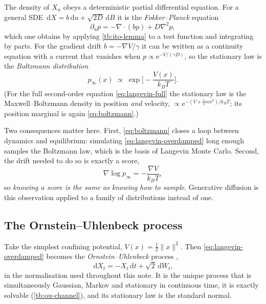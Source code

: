 \documentclass[11pt,a4paper]{article}
\newcommand{\dd}{\,\mathrm d}
\newcommand{\e}{\mathrm e}
\begin{document}
The density of $X_u$ obeys a deterministic partial differential equation. For a general SDE
$\dd X=b\dd u+\sqrt{2D}\dd B$ it is the \emph{Fokker--Planck} equation
\begin{equation}
 \partial_u p=-\nabla\cdot(bp)+D\nabla^2p ,
 \label{eq:fokker-planck}
\end{equation}
which one obtains by applying \cref{tb:ito-lemma} to a test function and integrating by parts.
For the gradient drift $b=-\nabla V/\gamma$ it can be written as a continuity equation with a
current that vanishes when $p\propto\e^{-V/(\gamma D)}$, so the stationary law is the
\emph{Boltzmann distribution}
\begin{equation}
 p_\infty(x)\;\propto\;\exp\!\Big[-\frac{V(x)}{k_BT}\Big].
 \label{eq:boltzmann}
\end{equation}
(For the full second-order equation \eqref{eq:langevin-full} the stationary law is the
Maxwell--Boltzmann density in position \emph{and} velocity, $\propto
\e^{-(V+\frac12m v^2)/k_BT}$; its position marginal is again \eqref{eq:boltzmann}.)

Two consequences matter here. First, \eqref{eq:boltzmann} closes a loop between dynamics and
equilibrium: simulating \eqref{eq:langevin-overdamped} long enough samples the Boltzmann law,
which is the basis of Langevin Monte Carlo. Second, the drift needed to do so is exactly a
score,
\begin{equation}
 \nabla\log p_\infty=-\frac{\nabla V}{k_BT} ,
\end{equation}
so \emph{knowing a score is the same as knowing how to sample}. Generative diffusion is this
observation applied to a family of distributions instead of one.

\subsection{The Ornstein--Uhlenbeck process}\label{sec:ou-intro}

Take the simplest confining potential, $V(x)=\tfrac12\|x\|^2$. Then
\eqref{eq:langevin-overdamped} becomes the \emph{Ornstein--Uhlenbeck} process
\citep{uhlenbeck1930theory},
\begin{equation}
 \dd X_t=-X_t\dd t+\sqrt2\dd W_t ,
 \label{eq:ou-intro}
\end{equation}
in the normalisation used throughout this note. It is the unique process that is
simultaneously Gaussian, Markov and stationary in continuous time, it is exactly solvable
(\cref{tb:ou-channel}), and its stationary law is the standard normal.
\end{document}
